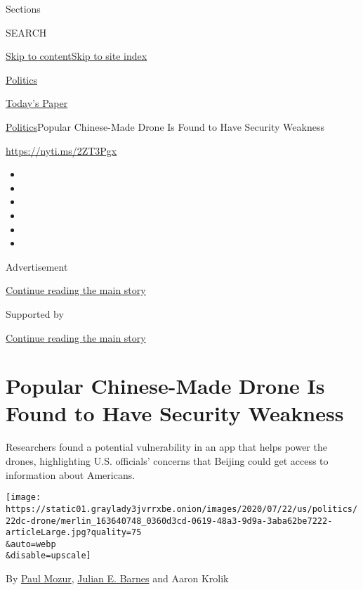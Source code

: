 Sections

SEARCH

\protect\hyperlink{site-content}{Skip to
content}\protect\hyperlink{site-index}{Skip to site index}

\href{https://www.nytimes3xbfgragh.onion/section/politics}{Politics}

\href{https://myaccount.nytimes3xbfgragh.onion/auth/login?response_type=cookie\&client_id=vi}{}

\href{https://www.nytimes3xbfgragh.onion/section/todayspaper}{Today's
Paper}

\href{/section/politics}{Politics}\textbar{}Popular Chinese-Made Drone
Is Found to Have Security Weakness

\href{https://nyti.ms/2ZT3Pgx}{https://nyti.ms/2ZT3Pgx}

\begin{itemize}
\item
\item
\item
\item
\item
\item
\end{itemize}

Advertisement

\protect\hyperlink{after-top}{Continue reading the main story}

Supported by

\protect\hyperlink{after-sponsor}{Continue reading the main story}

\hypertarget{popular-chinese-made-drone-is-found-to-have-security-weakness}{%
\section{Popular Chinese-Made Drone Is Found to Have Security
Weakness}\label{popular-chinese-made-drone-is-found-to-have-security-weakness}}

Researchers found a potential vulnerability in an app that helps power
the drones, highlighting U.S. officials' concerns that Beijing could get
access to information about Americans.

\texttt{[image: https://static01.graylady3jvrrxbe.onion/images/2020/07/22/us/politics/22dc-drone/merlin\_163640748\_0360d3cd-0619-48a3-9d9a-3aba62be7222-articleLarge.jpg?quality=75\\\&auto=webp\\\&disable=upscale]}

By \href{https://www.nytimes3xbfgragh.onion/by/paul-mozur}{Paul Mozur},
\href{https://www.nytimes3xbfgragh.onion/by/julian-e-barnes}{Julian E.
Barnes} and Aaron Krolik

